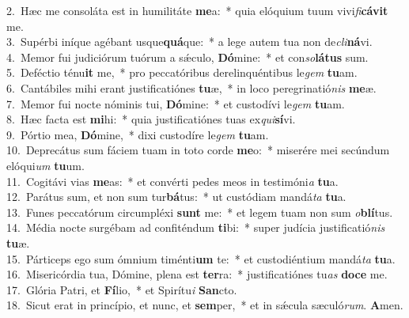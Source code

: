 {2.~}Hæc me consoláta est in humilitáte \textbf{me}a:~* quia elóquium tuum vivi\textit{fi}\textbf{cá}\textbf{vit} me.\\
{3.~}Supérbi iníque agébant usque\textbf{quá}que:~* a lege autem tua non de\textit{cli}\textbf{ná}vi.\\
{4.~}Memor fui judiciórum tuórum a sǽculo, \textbf{Dó}mine:~* et con\textit{so}\textbf{lá}\textbf{tus} sum.\\
{5.~}Deféctio ténu\textbf{it} me,~* pro peccatóribus derelinquéntibus le\textit{gem} \textbf{tu}am.\\
{6.~}Cantábiles mihi erant justificatiónes \textbf{tu}æ,~* in loco peregrinatió\textit{nis} \textbf{me}æ.\\
{7.~}Memor fui nocte nóminis tui, \textbf{Dó}mine:~* et custodívi le\textit{gem} \textbf{tu}am.\\
{8.~}Hæc facta est \textbf{mi}hi:~* quia justificatiónes tuas ex\textit{qui}\textbf{sí}vi.\\
{9.~}Pórtio mea, \textbf{Dó}mine,~* dixi custodíre le\textit{gem} \textbf{tu}am.\\
{10.~}Deprecátus sum fáciem tuam in toto corde \textbf{me}o:~* miserére mei secúndum elóqui\textit{um} \textbf{tu}um.\\
{11.~}Cogitávi vias \textbf{me}as:~* et convérti pedes meos in testimóni\textit{a} \textbf{tu}a.\\
{12.~}Parátus sum, et non sum tur\textbf{bá}tus:~* ut custódiam mandá\textit{ta} \textbf{tu}a.\\
{13.~}Funes peccatórum circumpléxi \textbf{sunt} me:~* et legem tuam non sum \textit{o}\textbf{blí}tus.\\
{14.~}Média nocte surgébam ad confiténdum \textbf{ti}bi:~* super judícia justificatió\textit{nis} \textbf{tu}æ.\\
{15.~}Párticeps ego sum ómnium timénti\textbf{um} te:~* et custodiéntium mandá\textit{ta} \textbf{tu}a.\\
{16.~}Misericórdia tua, Dómine, plena est \textbf{ter}ra:~* justificatiónes tu\textit{as} \textbf{do}\textbf{ce} me.\\
{17.~}Glória Patri, et \textbf{Fí}lio,~* et Spirítu\textit{i} \textbf{San}cto.\\
{18.~}Sicut erat in princípio, et nunc, et \textbf{sem}per,~* et in sǽcula sæculó\textit{rum}. \textbf{A}men.\\
